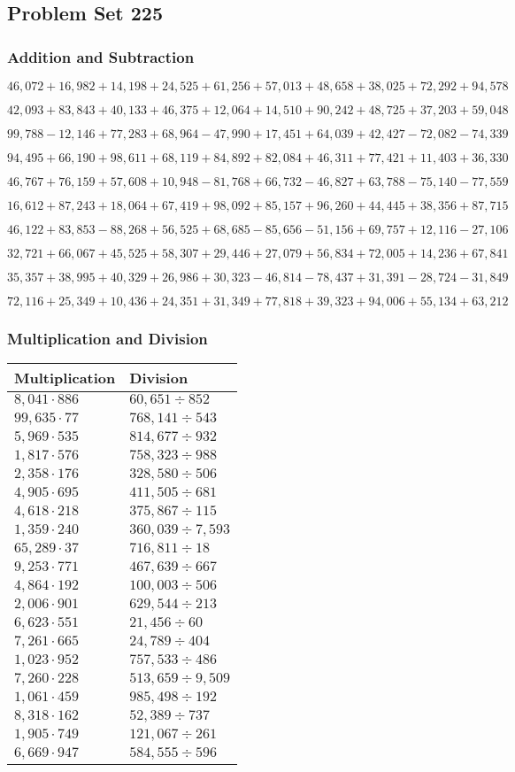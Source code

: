 \hypertarget{problem-set-225}{%
\subsection{Problem Set 225}\label{problem-set-225}}

\hypertarget{addition-and-subtraction}{%
\subsubsection{Addition and
Subtraction}\label{addition-and-subtraction}}

\(46,072+16,982+14,198+24,525+61,256+57,013+48,658+38,025+72,292+94,578\)

\(42,093+83,843+40,133+46,375+12,064+14,510+90,242+48,725+37,203+59,048\)

\(99,788-12,146+77,283+68,964-47,990+17,451+64,039+42,427-72,082-74,339\)

\(94,495+66,190+98,611+68,119+84,892+82,084+46,311+77,421+11,403+36,330\)

\(46,767+76,159+57,608+10,948-81,768+66,732-46,827+63,788-75,140-77,559\)

\(16,612+87,243+18,064+67,419+98,092+85,157+96,260+44,445+38,356+87,715\)

\(46,122+83,853-88,268+56,525+68,685-85,656-51,156+69,757+12,116-27,106\)

\(32,721+66,067+45,525+58,307+29,446+27,079+56,834+72,005+14,236+67,841\)

\(35,357+38,995+40,329+26,986+30,323-46,814-78,437+31,391-28,724-31,849\)

\(72,116+25,349+10,436+24,351+31,349+77,818+39,323+94,006+55,134+63,212\)

\hypertarget{multiplication-and-division}{%
\subsubsection{Multiplication and
Division}\label{multiplication-and-division}}

\begin{longtable}[]{@{}ll@{}}
\toprule
Multiplication & Division\tabularnewline
\midrule
\endhead
\(8,041\cdot886\) & \(60,651÷852\)\tabularnewline
\(99,635\cdot77\) & \(768,141÷543\)\tabularnewline
\(5,969\cdot535\) & \(814,677÷932\)\tabularnewline
\(1,817\cdot576\) & \(758,323÷988\)\tabularnewline
\(2,358\cdot176\) & \(328,580÷506\)\tabularnewline
\(4,905\cdot695\) & \(411,505÷681\)\tabularnewline
\(4,618\cdot218\) & \(375,867÷115\)\tabularnewline
\(1,359\cdot240\) & \(360,039÷7,593\)\tabularnewline
\(65,289\cdot37\) & \(716,811÷18\)\tabularnewline
\(9,253\cdot771\) & \(467,639÷667\)\tabularnewline
\(4,864\cdot192\) & \(100,003÷506\)\tabularnewline
\(2,006\cdot901\) & \(629,544÷213\)\tabularnewline
\(6,623\cdot551\) & \(21,456÷60\)\tabularnewline
\(7,261\cdot665\) & \(24,789÷404\)\tabularnewline
\(1,023\cdot952\) & \(757,533÷486\)\tabularnewline
\(7,260\cdot228\) & \(513,659÷9,509\)\tabularnewline
\(1,061\cdot459\) & \(985,498÷192\)\tabularnewline
\(8,318\cdot162\) & \(52,389÷737\)\tabularnewline
\(1,905\cdot749\) & \(121,067÷261\)\tabularnewline
\(6,669\cdot947\) & \(584,555÷596\)\tabularnewline
\bottomrule
\end{longtable}
